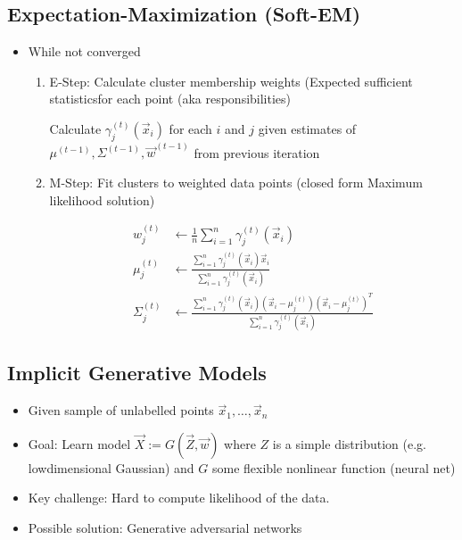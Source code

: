 \documentclass[10pt,a4paper]{scrartcl}
\begin{document}
\begin{multicols*}{2}
\subsection{Expectation-Maximization (Soft-EM)}

\begin{itemize}
\item While not converged
\begin{enumerate}
\item E-Step: Calculate cluster membership weights (\glqq Expected sufficient statistics\grqq for each point (aka \glqq responsibilities\grqq)

Calculate $\gamma_j^{(t)}(\vec{x}_i)$ for each $i$ and $j$ given estimates of $\mu^{(t-1)},\Sigma^{(t-1)},\vec{w}^{(t-1)}$ from previous iteration
\item M-Step: Fit clusters to weighted data points (closed form Maximum likelihood solution)

\begin{align*}
w_j^{(t)}&\leftarrow \frac{1}{n}\sum\limits_{i=1}^n \gamma_j^{(t)}(\vec{x}_i)\\
\mu_j^{(t)}&\leftarrow \frac{\sum\limits_{i=1}^n\gamma_j^{(t)}(\vec{x}_i)\vec{x}_i}{\sum\limits_{i=1}^n\gamma_j^{(t)}(\vec{x}_i)}\\
\Sigma_j^{(t)}&\leftarrow\frac{\sum\limits_{i=1}^n\gamma_j^{(t)}(\vec{x}_i)(\vec{x}_i-\mu_j^{(t)})(\vec{x}_i-\mu_j^{(t)})^T}{\sum\limits_{i=1}^n\gamma_j^{(t)}(\vec{x}_i)}
\end{align*}
\end{enumerate}
\end{itemize}

\subsection{Implicit Generative Models}

\begin{itemize}
\item Given sample of unlabelled points $\vec{x}_1,\ldots,\vec{x}_n$
\item Goal: Learn model $\vec{X}:=G(\vec{Z},\vec{w})$ where $Z$ is a simple distribution (e.g. lowdimensional Gaussian) and $G$ some flexible nonlinear function (neural net)
\item Key challenge: Hard to compute likelihood of the data.
\item Possible solution: Generative adversarial networks
\end{itemize}


\end{multicols*}
\end{document}
